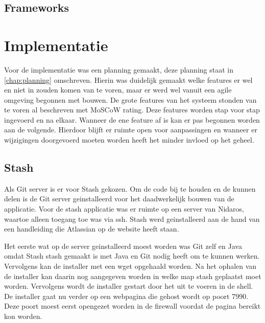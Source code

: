 \documentclass[a4paper,11pt,oneside]{report}
\begin{document}
\begin{lstlisting}
\end{lstlisting}


\section{Frameworks}

\chapter{Implementatie}
Voor de implementatie was een planning gemaakt, deze planning staat in
\ref{chap:planning} omschreven. Hierin was duidelijk gemaakt welke features er
wel en niet in zouden komen van te voren, maar er werd wel vanuit een agile
omgeving begonnen met bouwen. De grote features van het systeem stonden van te
voren al beschreven met MoSCoW rating. Deze features worden stap voor stap
ingevoerd en na elkaar. Wanneer de ene feature af is kan er pas begonnen worden
aan de volgende. Hierdoor blijft er ruimte open voor aanpassingen en wanneer er
wijzigingen doorgevoerd moeten worden heeft het minder invloed op het geheel.

\section{Stash}
Als Git server is er voor Stash gekozen. Om de code bij te houden en de kunnen
delen is de Git server geinstalleerd voor het daadwerkelijk bouwen van de
applicatie. Voor de stash applicatie was er ruimte op een server van Nidaros,
waartoe alleen toegang toe was via ssh. Stash werd geinstalleerd aan de hand van
een handleiding die Atlassian op de website heeft staan.

Het eerste wat op de server geinstalleerd moest worden was Git zelf en Java
omdat Stash stash gemaakt is met Java en Git nodig heeft om te kunnen werken.
Vervolgens kan de installer met een wget opgehaald worden. Na het ophalen van de
installer kan daarin nog aangegeven worden in welke map stash geplaatst moet
worden. Vervolgens wordt de installer gestart door het uit te voeren in de
shell. De installer gaat nu verder op een webpagina die gehost wordt op poort
7990. Deze poort moest eerst opengezet worden in de firewall voordat de pagina
bereikt kon worden.
\end{document}
